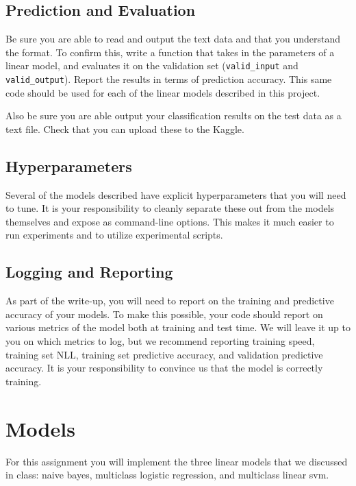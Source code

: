 \documentclass[11pt]{article}
\begin{document}
\subsection{Prediction and Evaluation}

Be sure you are able to read and output the text data 
and that you understand the format. To confirm this, write a function 
that takes in the parameters of a linear model, and evaluates it on 
the validation set (\texttt{valid\_input} and \texttt{valid\_output}).
Report the results in terms of prediction accuracy. This same code should 
be used for each of the linear models described in this project. 

Also be sure you are able output your classification results on the test data as 
a text file. Check that you can upload these to the Kaggle.

\subsection{Hyperparameters}

Several of the models described have explicit hyperparameters that you will 
need to tune. It is your responsibility to cleanly separate these out from 
the models themselves and expose as command-line options. This makes it much 
easier to run experiments and to utilize experimental scripts. 

\subsection{Logging and Reporting}

As part of the write-up, you will need to report on the training and
predictive accuracy of your models. To make this possible, your code
should report on various metrics of the model both at training and
test time. We will leave it up to you on which metrics to log, but we
recommend reporting training speed, training set NLL, training set
predictive accuracy, and validation predictive accuracy. It is your
responsibility to convince us that the model is correctly training.

\section{Models}

For this assignment you will implement the three linear models that 
we discussed in class: naive bayes, multiclass logistic regression, 
and multiclass linear svm.
\end{document}
